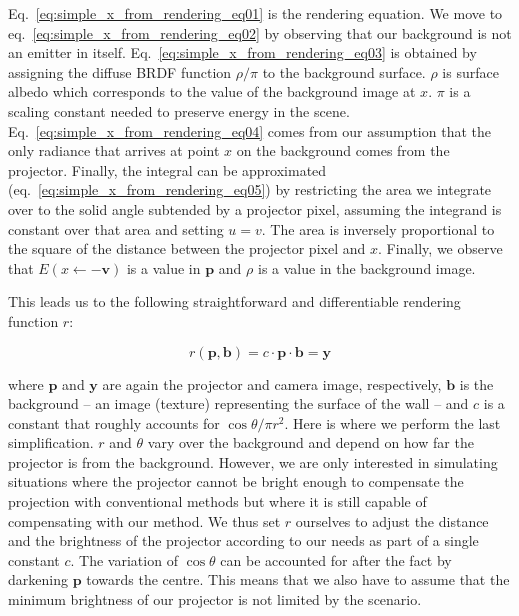 Eq.~\ref{eq:simple_x_from_rendering_eq01} is the rendering equation. We move to eq.~\ref{eq:simple_x_from_rendering_eq02} by observing that our background is not an emitter in itself. Eq.~\ref{eq:simple_x_from_rendering_eq03} is obtained by assigning the diffuse BRDF function \(\rho / \pi\) to the background surface. \(\rho\) is surface albedo which corresponds to the value of the background image at \(x\). \(\pi\) is a scaling constant needed to preserve energy in the scene. Eq.~\ref{eq:simple_x_from_rendering_eq04} comes from our assumption that the only radiance that arrives at point \(x\) on the background comes from the projector. Finally, the integral can be approximated (eq.~\ref{eq:simple_x_from_rendering_eq05}) by restricting the area we integrate over to the solid angle subtended by a projector pixel, assuming the integrand is constant over that area and setting \(u = v\). The area is inversely proportional to the square of the distance between the projector pixel and \(x\). Finally, we observe that \(E(x \leftarrow \mathbf{-v})\) is a value in \(\bm{p}\) and \(\rho\) is a value in the background image.

This leads us to the following straightforward and differentiable rendering function \(r\):

\begin{equation}
    \label{eq:rendering_function-simple}
    r(\bm{p}, \bm{b}) = c \cdot \bm{p} \cdot \bm{b} = \bm{y}
\end{equation}

where \(\bm{p}\) and \(\bm{y}\) are again the projector and camera image, respectively, \(\bm{b}\) is the background -- an image (texture) representing the surface of the wall -- and \(c\) is a constant that roughly accounts for \(\cos \theta / \pi r^2\). Here is where we perform the last simplification. \(r\) and \(\theta\) vary over the background and depend on how far the projector is from the background. However, we are only interested in simulating situations where the projector cannot be bright enough to compensate the projection with conventional methods but where it is still capable of compensating with our method. We thus set \(r\) ourselves to adjust the distance and the brightness of the projector according to our needs as part of a single constant \(c\). The variation of \(\cos \theta\) can be accounted for after the fact by darkening \(\bm{p}\) towards the centre. This means that we also have to assume that the minimum brightness of our projector is not limited by the scenario.

